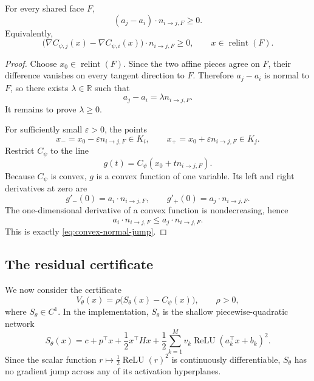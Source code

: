 \begin{lemma}
\label{lem:convex-normal-jump}
For every shared face \(F\),
\begin{equation}
    (a_j-a_i)\cdot n_{i\to j,F}\geq 0.
    \label{eq:convex-normal-jump}
\end{equation}
Equivalently,
\[
    \bigl(\nabla C_{\psi,j}(x)-\nabla C_{\psi,i}(x)\bigr)
    \cdot n_{i\to j,F}
    \geq 0,
    \qquad x\in\operatorname{relint}(F).
\]
\end{lemma}

\begin{proof}
Choose \(x_0\in\operatorname{relint}(F)\).  Since the two affine pieces agree
on \(F\), their difference vanishes on every tangent direction to \(F\).
Therefore \(a_j-a_i\) is normal to \(F\), so there exists
\(\lambda\in\mathbb R\) such that
\[
    a_j-a_i=\lambda n_{i\to j,F}.
\]
It remains to prove \(\lambda\geq 0\).

For sufficiently small \(\varepsilon>0\), the points
\[
    x_-=x_0-\varepsilon n_{i\to j,F}\in K_i,
    \qquad
    x_+=x_0+\varepsilon n_{i\to j,F}\in K_j.
\]
Restrict \(C_\psi\) to the line
\[
    g(t)=C_\psi(x_0+t n_{i\to j,F}).
\]
Because \(C_\psi\) is convex, \(g\) is a convex function of one variable.
Its left and right derivatives at zero are
\[
    g'_-(0)=a_i\cdot n_{i\to j,F},
    \qquad
    g'_+(0)=a_j\cdot n_{i\to j,F}.
\]
The one-dimensional derivative of a convex function is nondecreasing, hence
\[
    a_i\cdot n_{i\to j,F}
    \leq
    a_j\cdot n_{i\to j,F}.
\]
This is exactly \eqref{eq:convex-normal-jump}.
\end{proof}

\subsection{The residual certificate}

We now consider the certificate
\begin{equation}
    V_\theta(x)
    =
    \rho\bigl(S_\theta(x)-C_\psi(x)\bigr),
    \qquad \rho>0,
    \label{eq:residual-icnn-certificate}
\end{equation}
where \(S_\theta\in C^1\).  In the implementation, \(S_\theta\) is the
shallow piecewise-quadratic network
\[
    S_\theta(x)
    =
    c+p^\top x+\frac12x^\top Hx
    +\frac12\sum_{k=1}^M
    v_k\operatorname{ReLU}(a_k^\top x+b_k)^2.
\]
Since the scalar function \(r\mapsto \tfrac12\operatorname{ReLU}(r)^2\) is
continuously differentiable, \(S_\theta\) has no gradient jump across any of
its activation hyperplanes.

